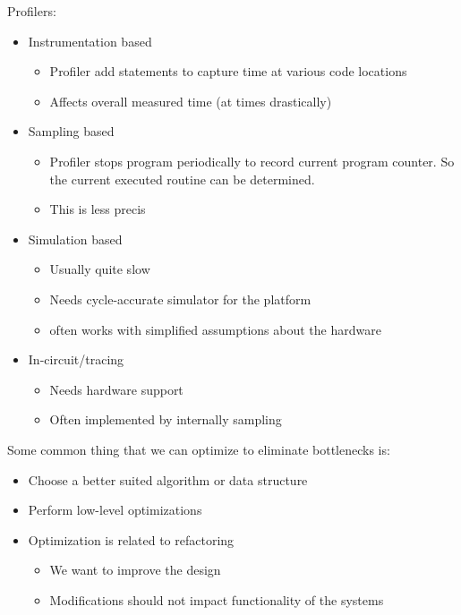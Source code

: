 Profilers:
\begin{itemize}
    \item Instrumentation based
    \begin{itemize}
        \item Profiler add statements to capture time at various code locations
        \item Affects overall measured time  (at times drastically)
    \end{itemize}
    \item Sampling based
    \begin{itemize}
        \item Profiler stops program periodically to record current program counter.
        So the current executed routine can be determined.
        \item This is less precis
    \end{itemize}
    \item Simulation based
    \begin{itemize}
        \item Usually quite slow
        \item Needs cycle-accurate simulator for the platform
        \item often works with simplified assumptions about the hardware
    \end{itemize}
    \item In-circuit/tracing
    \begin{itemize}
        \item Needs hardware support
        \item Often implemented by internally sampling 
    \end{itemize}
\end{itemize}

Some common thing that we can optimize to eliminate bottlenecks is:
\begin{itemize}
    \item Choose a better suited algorithm or data structure
    \item Perform low-level optimizations
    \item Optimization is related to refactoring
    \begin{itemize}
        \item We want to improve the design
        \item Modifications should not impact functionality of the systems
    \end{itemize}
\end{itemize}

